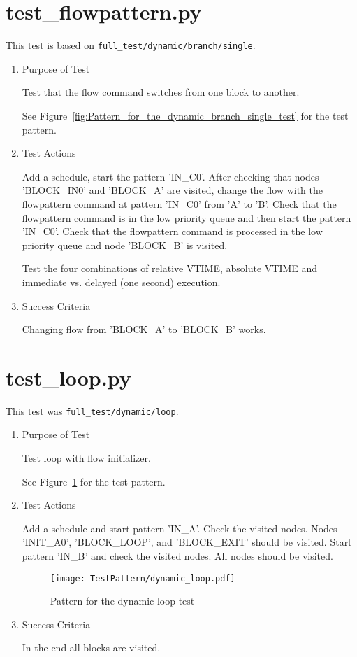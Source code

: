 \documentclass[12pt,a4paper]{report}
\begin{document}
\section{test\_flowpattern.py}
This test is based on \texttt{full\_test/dynamic/branch/single}.
\begin{enumerate}
	\item Purpose of Test

	Test that the flow command switches from one block to another.

	See Figure~\ref{fig:Pattern_for_the_dynamic_branch_single_test} for the test pattern.
	\item Test Actions

	Add a schedule, start the pattern 'IN\_C0'. After checking that nodes 'BLOCK\_IN0' and 'BLOCK\_A' are visited,
        change the flow with the flowpattern command at pattern 'IN\_C0' from 'A' to 'B'. Check that the flowpattern
        command is in the low priority queue and then start the pattern 'IN\_C0'. Check that the flowpattern
        command is processed in the low priority queue and node 'BLOCK\_B' is visited.

  Test the four combinations of relative VTIME, absolute VTIME and immediate vs. delayed (one second) execution.
	\item Success Criteria

	Changing flow from 'BLOCK\_A' to 'BLOCK\_B' works.
\end{enumerate}
\section{test\_loop.py}
This test was \texttt{full\_test/dynamic/loop}.
\begin{enumerate}
	\item Purpose of Test

        Test loop with flow initializer.

	See Figure~\ref{fig:Pattern_for_the_dynamic_loop_test} for the test pattern.
	\item Test Actions

        Add a schedule and start pattern 'IN\_A'. Check the visited nodes. Nodes 'INIT\_A0', 'BLOCK\_LOOP', and 'BLOCK\_EXIT'
        should be visited. Start pattern 'IN\_B' and check the visited nodes. All nodes should be visited.
    \begin{figure}
        \centering
        \texttt{[image: TestPattern/dynamic\_loop.pdf]}
        \caption{Pattern for the dynamic loop test}
        \label{fig:Pattern_for_the_dynamic_loop_test}
    \end{figure}
	\item Success Criteria

	In the end all blocks are visited.
\end{enumerate}
\end{document}
